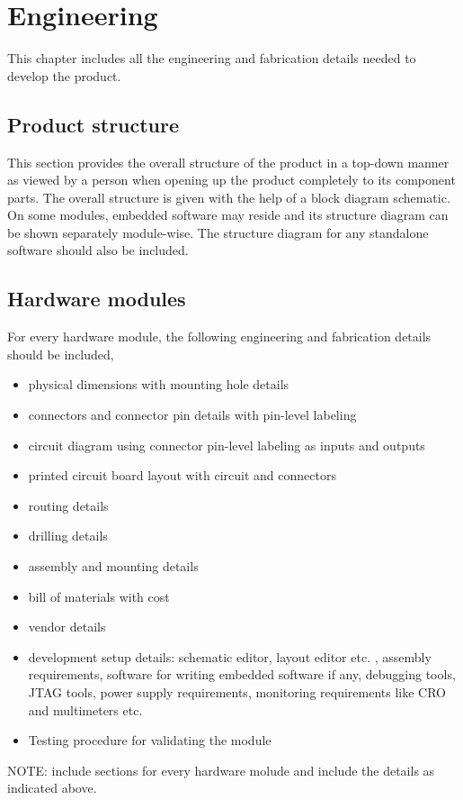 
\chapter{Engineering}

This chapter includes all the engineering and fabrication details
needed to develop the product. 

\section{Product structure}

This section provides the overall structure of the product in a top-down
manner as viewed by a person when opening up the product completely
to its component parts. The overall structure is given with the help
of a block diagram schematic. On some modules, embedded software may
reside and its structure diagram can be shown separately module-wise.
The structure diagram for any standalone software should also be included.

\section{Hardware modules}

For every hardware module, the following engineering and fabrication
details should be included,
\begin{itemize}
\item physical dimensions with mounting hole details
\item connectors and connector pin details with pin-level labeling
\item circuit diagram using connector pin-level labeling as inputs and outputs
\item printed circuit board layout with circuit and connectors
\item routing details
\item drilling details
\item assembly and mounting details
\item bill of materials with cost
\item vendor details
\item development setup details: schematic editor, layout editor etc. ,
assembly requirements, software for writing embedded software if any,
debugging tools, JTAG tools, power supply requirements, monitoring
requirements like CRO and multimeters etc.
\item Testing procedure for validating the module
\end{itemize}
NOTE: include sections for every hardware molude and include the details
as indicated above.

